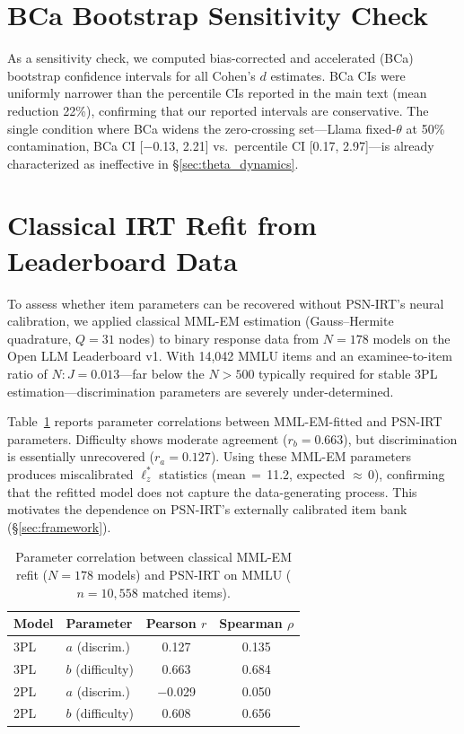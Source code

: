 \section{BCa Bootstrap Sensitivity Check}
\label{app:bca}

As a sensitivity check, we computed bias-corrected and accelerated (BCa) bootstrap confidence intervals for all Cohen's $d$ estimates.
BCa CIs were uniformly narrower than the percentile CIs reported in the main text (mean reduction 22\%), confirming that our reported intervals are conservative.
The single condition where BCa widens the zero-crossing set---Llama fixed-$\theta$ at 50\% contamination, BCa CI [$-$0.13, 2.21] vs.\ percentile CI [0.17, 2.97]---is already characterized as ineffective in \S\ref{sec:theta_dynamics}.

\section{Classical IRT Refit from Leaderboard Data}
\label{app:mml_em}

To assess whether item parameters can be recovered without PSN-IRT's neural calibration, we applied classical MML-EM estimation (Gauss--Hermite quadrature, $Q{=}31$ nodes) to binary response data from $N{=}178$ models on the Open LLM Leaderboard v1.
With 14,042 MMLU items and an examinee-to-item ratio of $N{:}J = 0.013$---far below the $N{>}500$ typically required for stable 3PL estimation---discrimination parameters are severely under-determined.

Table~\ref{tab:mml_em} reports parameter correlations between MML-EM-fitted and PSN-IRT parameters.
Difficulty shows moderate agreement ($r_b{=}0.663$), but discrimination is essentially unrecovered ($r_a{=}0.127$).
Using these MML-EM parameters produces miscalibrated $\ell_z^*$ statistics (mean$\,{=}\,$11.2, expected ${\approx}\,$0), confirming that the refitted model does not capture the data-generating process.
This motivates the dependence on PSN-IRT's externally calibrated item bank (\S\ref{sec:framework}).

\begin{table}[t]
\centering
\caption{Parameter correlation between classical MML-EM refit ($N{=}178$ models) and PSN-IRT on MMLU ($n{=}10{,}558$ matched items).}
\label{tab:mml_em}
\footnotesize
\begin{tabular}{@{}llcc@{}}
\toprule
Model & Parameter & Pearson $r$ & Spearman $\rho$ \\
\midrule
3PL & $a$ (discrim.) & 0.127 & 0.135 \\
3PL & $b$ (difficulty) & 0.663 & 0.684 \\
2PL & $a$ (discrim.) & $-$0.029 & 0.050 \\
2PL & $b$ (difficulty) & 0.608 & 0.656 \\
\bottomrule
\end{tabular}
\end{table}


